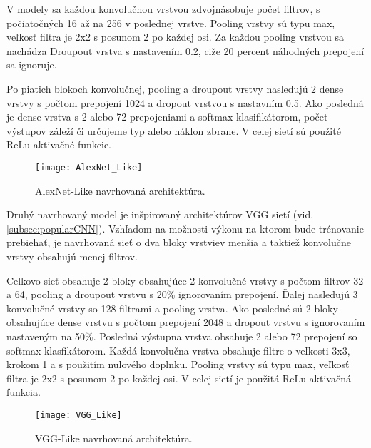 V modely sa každou konvolučnou vrstvou zdvojnásobuje počet filtrov, s počiatočných 16 až na 256 v poslednej vrstve.
Pooling vrstvy sú typu max, veľkosť filtra je 2x2 s posunom 2 po každej osi.
Za každou pooling vrstvou sa nachádza Droupout vrstva s nastavením 0.2, ciže 20 percent náhodných prepojení sa ignoruje.

Po piatich blokoch konvolučnej, pooling a droupout vrstvy nasledujú 2 dense vrstvy s počtom prepojení 1024 a dropout vrstvou s nastavním 0.5.
Ako posledná je dense vrstva s 2 alebo 72 prepojeniami a softmax klasifikátorom, počet výstupov záleží či určujeme typ alebo náklon zbrane.
V celej sietí sú použité ReLu aktivačné funkcie.

\begin{figure}[H]
    \centering
    \texttt{[image: AlexNet\_Like]}
    \caption{AlexNet-Like navrhovaná architektúra.}
    \label{pic:kNN}
\end{figure}


Druhý navrhovaný model je inšpirovaný architektúrov VGG sietí (vid. \ref{subsec:popularCNN}).
Vzhľadom na možnosti výkonu na ktorom bude trénovanie prebiehať, je navrhovaná sieť o dva bloky vrstviev menšia a taktiež konvolučne vrstvy obsahujú menej filtrov.

Celkovo sieť obsahuje 2 bloky obsahujúce 2 konvolučné vrstvy s počtom filtrov 32 a 64, pooling a droupout vrstvu s 20\% ignorovaním prepojení.
Ďalej nasledujú 3 konvolučné vrstvy so 128 filtrami a pooling vrstva.
Ako posledné sú 2 bloky obsahujúce dense vrstvu s počtom prepojení 2048 a dropout vrstvu s ignorovaním nastaveným na 50\%.
Posledná výstupna vrstva obsahuje 2 alebo 72 prepojení so softmax klasfikátorom.
Každá konvolučna vrstva obsahuje filtre o veľkosti 3x3, krokom 1 a s použitím nulového doplnku.
Pooling vrstvy sú typu max, veľkosť filtra je 2x2 s posunom 2 po každej osi.
V celej sietí je použitá ReLu aktivačná funkcia.

\begin{figure}[H]
    \centering
    \texttt{[image: VGG\_Like]}
    \caption{VGG-Like navrhovaná architektúra.}
    \label{pic:kNN}
\end{figure}
